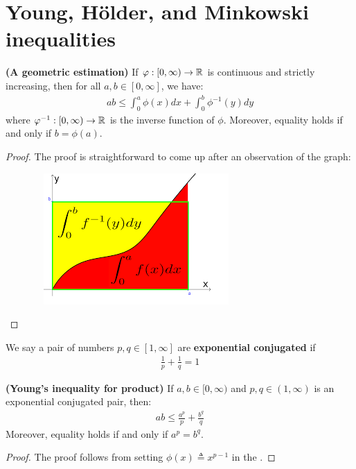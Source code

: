 \documentclass{report}
\begin{document}
\section{Young, Hölder, and Minkowski inequalities}
\begin{theorem}
\label{THage}
  \textbf{(A geometric estimation)} If $\varphi: [0,\infty) \rightarrow \mathbb{R}$ is continuous and strictly increasing, then for all $a,b \in [0,\infty]$, we have: 
\begin{align*}
  ab \leq \int_0^a \phi (x)dx + \int_0^b \phi^{-1}(y)dy
\end{align*}
where $\varphi^{-1}:[0,\infty)\rightarrow \mathbb{R}$ is the inverse function of $\phi$. Moreover, equality holds if and only if $b= \phi (a)$.    
\end{theorem}
\begin{proof}
The proof is straightforward to come up after an observation of the graph: 
\begin{center}
   \begin{minipage}{0.9\linewidth}  
       \centering
       \includegraphics[height=5cm,width=10cm]{young.png}
   \end{minipage}
\end{center}
\end{proof}
We say a pair of numbers $p,q\in [1,\infty]$ are \textbf{exponential conjugated} if 
\begin{align*}
\frac{1}{p}+ \frac{1}{q}=1
\end{align*}
\begin{theorem}
\label{THYi}
\textbf{(Young's inequality for product)} If $a,b \in [0,\infty)$ and $p,q \in (1,\infty)$ is an  exponential conjugated pair, then: 
\begin{align*}
  ab \leq  \frac{a^p}{p} + \frac{b^q}{q}
\end{align*}
Moreover, equality holds if and only if $a^p=b^q$. 
\end{theorem}
\begin{proof}
The proof follows from setting $\phi(x)\triangleq x^{p-1}$ in the . 
\end{proof}
\end{document}
